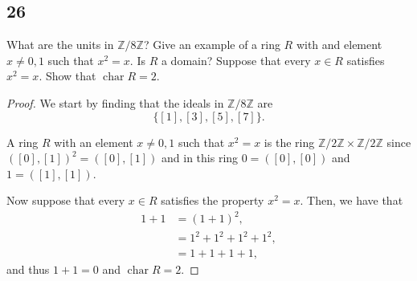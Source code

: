 \documentclass{article}
\newcommand{\Z}{\mathbb{Z}}
\newcommand{\ZmodnZ}[1]{\Z / #1 \Z}
\DeclareMathOperator*{\rchar}{char}
\newenvironment{hwproof}[1]
{
    #1
    \begin{proof}
}{
    \end{proof}
}
\begin{document}
\subsection*{26}
\begin{hwproof}
    {
        What are the units in $\ZmodnZ{8}$? Give an example of a ring $R$ with
        and element $x \neq 0,1$ such that $x^2 = x$. Is $R$ a domain? Suppose
        that every $x \in R$ satisfies $x^2 = x$. Show that $\rchar R = 2$.
    }
    We start by finding that the ideals in $\ZmodnZ{8}$ are
    \begin{equation*}
        \{[1], [3], [5], [7]\}.
    \end{equation*}

    A ring $R$ with an element $x \neq 0,1$ such that $x^2 = x$ is the ring
    $\ZmodnZ{2} \times \ZmodnZ{2}$ since $([0],[1])^2 = ([0],[1])$ and in this
    ring $0 = ([0],[0])$ and $1 = ([1],[1])$.

    Now suppose that every $x\in R$ satisfies the property $x^2 = x$. Then, we
    have that
    \begin{align*}
        1 + 1 & = (1 + 1)^2,             \\
              & = 1^2 + 1^2 + 1^2 + 1^2, \\
              & = 1 + 1 + 1 + 1,
    \end{align*}
    and thus $1 + 1 = 0$ and $\rchar R = 2$.
\end{hwproof}
\end{document}
